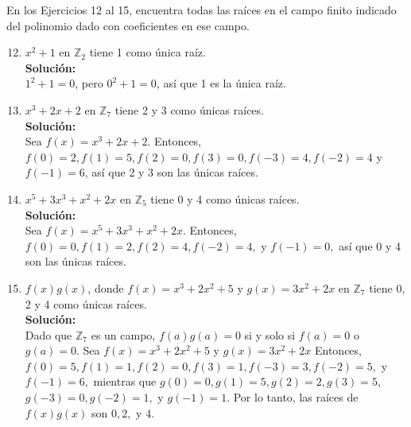 \noindent
En los Ejercicios 12 al 15, encuentra todas las raíces en el campo finito indicado del polinomio dado con coeficientes en ese campo.
\begin{enumerate}
	\setcounter{enumi}{11}
	\item $x^2 + 1$ en $\mathbb{Z}_2$ tiene 1 como única raíz.
	\\ \textbf{Solución:} \\
	$1^{2}+1=0$, pero  $0^2 + 1 = 0$, así que 1 es la única raíz.
	
	\item $x^3 + 2x + 2$ en $\mathbb{Z}_7$ tiene 2 y 3 como únicas raíces.
	\\ \textbf{Solución:} \\
	Sea  $f(x) = x^3 + 2x + 2$. Entonces,  $f(0) = 2, f(1) = 5, f(2) = 0, f(3) = 0, f(-3) = 4, f(-2) = 4$ y  $f(-1) = 6$, así que 2 y 3 son las únicas raíces.
	\item $x^5 + 3x^3 + x^2 + 2x$ en $\mathbb{Z}_5$ tiene 0 y 4 como únicas raíces.
	\\ \textbf{Solución:} \\
	Sea $f(x) = x^5 + 3x^3 + x^2 + 2x.$ Entonces, $f(0) = 0, f(1) = 2, f(2) = 4, f(-2) = 4,$  y  $f(-1) = 0,$ así que 0 y 4 son las únicas raíces.
	\item $f(x)g(x)$, donde $f(x) = x^3 + 2x^2 + 5$ y $g(x) = 3x^2 + 2x$ en $\mathbb{Z}_7$ tiene 0, 2 y 4 como únicas raíces.
	\\ \textbf{Solución:} \\
	Dado que  $\mathbb{Z}_7$ es un campo,  $f(a)g(a) = 0$ si y solo si $f(a) = 0$  o  $g(a) = 0.$ Sea  $f(x) = x^3 + 2x^2 + 5 $ y  $g(x) = 3x^2 + 2x$ Entonces,  $f(0) = 5, f(1) = 1, f(2) = 0, f(3) = 1, f(-3) = 3, f(-2) = 5,$ y  $f(-1) = 6,$  mientras que  $g(0) = 0, g(1) = 5, g(2) = 2, g(3) = 5,$ $g(-3) = 0, g(-2) = 1,$  y  $g(-1) = 1.$  Por lo tanto, las raíces de  $f(x)g(x)$ son  $0, 2,$  y  $4.$
	

\end{enumerate}
